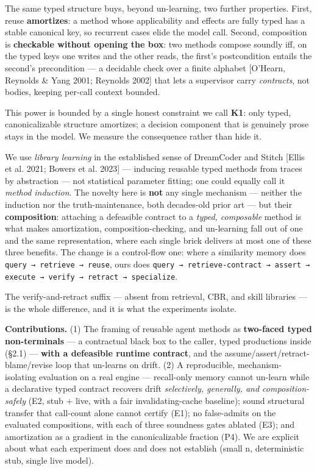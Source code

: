 \documentclass[11pt]{article}
\begin{document}
The same typed structure buys, beyond un-learning, two further properties. First, reuse \textbf{amortizes}: a method whose applicability and effects are fully typed has a stable canonical key, so recurrent cases elide the model call. Second, composition is \textbf{checkable without opening the box}: two methods compose soundly iff, on the typed keys one writes and the other reads, the first's postcondition entails the second's precondition — a decidable check over a finite alphabet [O'Hearn, Reynolds \& Yang 2001; Reynolds 2002] that lets a supervisor carry \emph{contracts}, not bodies, keeping per-call context bounded.

This power is bounded by a single honest constraint we call \textbf{K1}: only typed, canonicalizable structure amortizes; a decision component that is genuinely prose stays in the model. We measure the consequence rather than hide it.

We use \emph{library learning} in the established sense of DreamCoder and Stitch [Ellis et al. 2021; Bowers et al. 2023] — inducing reusable typed methods from traces by abstraction — not statistical parameter fitting; one could equally call it \emph{method induction}. The novelty here is \textbf{not} any single mechanism — neither the induction nor the truth-maintenance, both decades-old prior art — but their \textbf{composition}: attaching a defeasible contract to a \emph{typed, composable} method is what makes amortization, composition-checking, and un-learning fall out of one and the same representation, where each single brick delivers at most one of these three benefits. The change is a control-flow one: where a similarity memory does \texttt{query → retrieve → reuse}, ours does \texttt{query → retrieve-contract → assert → execute → verify → retract → specialize}.

The verify-and-retract suffix — absent from retrieval, CBR, and skill libraries — is the whole difference, and it is what the experiments isolate.

\textbf{Contributions.} (1) The framing of reusable agent methods as \textbf{two-faced typed non-terminals} — a contractual black box to the caller, typed productions inside (§2.1) — \textbf{with a defeasible runtime contract}, and the assume/assert/retract-blame/revise loop that un-learns on drift. (2) A reproducible, mechanism-isolating evaluation on a real engine — recall-only memory cannot un-learn while a declarative typed contract recovers drift \emph{selectively, generally, and composition-safely} (E2, stub + live, with a fair invalidating-cache baseline); sound structural transfer that call-count alone cannot certify (E1); no false-admits on the evaluated compositions, with each of three soundness gates ablated (E3); and amortization as a gradient in the canonicalizable fraction (P4). We are explicit about what each experiment does and does not establish (small n, deterministic stub, single live model).
\end{document}
